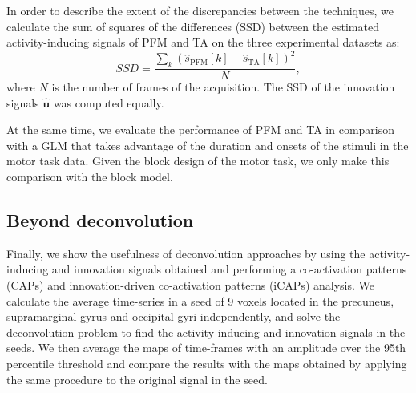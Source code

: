 In order to describe the extent of the discrepancies between the techniques, we calculate the sum of squares of the differences (SSD) between the estimated activity-inducing signals of PFM and TA on the three experimental datasets as:
\begin{equation}
    SSD = \frac{\sum_{k}{(\hat{s}_\text{PFM}[k] - \hat{s}_\text{TA}[k])^2}}{N},
\end{equation}
where $N$ is the number of frames of the acquisition. The SSD of the innovation signals $\mathbf{\hat{u}}$ was computed equally.

At the same time, we evaluate the performance of PFM and TA in comparison with a GLM that takes advantage of the duration and onsets of the stimuli in the motor task data. Given the block design of the motor task, we only make this comparison with the block model.

\subsection{Beyond deconvolution}
Finally, we show the usefulness of deconvolution approaches by using the activity-inducing and innovation signals obtained and performing a co-activation patterns (CAPs) and innovation-driven co-activation patterns (iCAPs) analysis. We calculate the average time-series in a seed of 9 voxels located in the precuneus, supramarginal gyrus and occipital gyri independently, and solve the deconvolution problem to find the activity-inducing and innovation signals in the seeds. We then average the maps of time-frames with an amplitude over the 95th percentile threshold and compare the results with the maps obtained by applying the same procedure to the original signal in the seed.